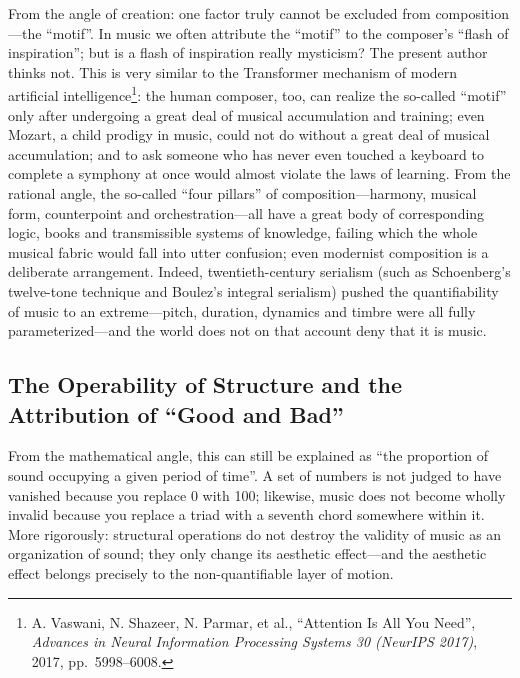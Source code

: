 \documentclass[11pt,a4paper]{article}
\begin{document}
From the angle of creation: one factor truly cannot be excluded from composition---the
``motif''. In music we often attribute the ``motif'' to the composer's ``flash of
inspiration''; but is a flash of inspiration really mysticism? The present author thinks
not. This is very similar to the Transformer mechanism of modern artificial
intelligence\footnote{A. Vaswani, N. Shazeer, N. Parmar, et al., ``Attention Is All You
Need'', \emph{Advances in Neural Information Processing Systems 30 (NeurIPS 2017)}, 2017,
pp.~5998--6008.}: the human composer, too, can realize the so-called ``motif'' only after
undergoing a great deal of musical accumulation and training; even Mozart, a child prodigy
in music, could not do without a great deal of musical accumulation; and to ask someone who
has never even touched a keyboard to complete a symphony at once would almost violate the
laws of learning. From the rational angle, the so-called ``four pillars'' of
composition---harmony, musical form, counterpoint and orchestration---all have a great body
of corresponding logic, books and transmissible systems of knowledge, failing which the
whole musical fabric would fall into utter confusion; even modernist composition is a
deliberate arrangement. Indeed, twentieth-century serialism (such as Schoenberg's
twelve-tone technique and Boulez's integral serialism) pushed the quantifiability of music
to an extreme---pitch, duration, dynamics and timbre were all fully parameterized---and
the world does not on that account deny that it is music.

\subsection{The Operability of Structure and the Attribution of ``Good and Bad''}

From the mathematical angle, this can still be explained as ``the proportion of sound
occupying a given period of time''. A set of numbers is not judged to have vanished
because you replace 0 with 100; likewise, music does not become wholly invalid because you
replace a triad with a seventh chord somewhere within it. More rigorously: structural
operations do not destroy the validity of music as an organization of sound; they only
change its aesthetic effect---and the aesthetic effect belongs precisely to the
non-quantifiable layer of motion.
\end{document}
